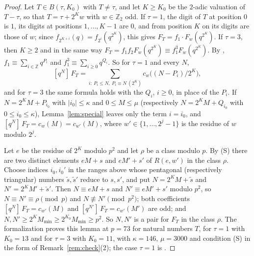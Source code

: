 \documentclass[12pt]{amsart}
\theoremstyle{definition}
\newcommand{\Z}{\mathbb{Z}}
\newcommand{\Zt}{\mathbb{Z}_2}
\newcommand{\B}{B}
\newcommand{\coef}[2]{[q^{#1}]\,#2}
\begin{document}
\begin{proof}
Let $T\in\B(\tau,K_0)$ with $T\ne\tau$, and let $K\ge K_0$ be the $2$-adic valuation of $T-\tau$, so that $T=\tau+2^Kw$ with $w\in\Zt$ odd. If $\tau=1$, the digit of $T$ at position $0$ is $1$, its digits at positions $1,\dots,K-1$ are $0$, and from position $K$ on its digits are those of $w$; since $f_{2^{K+i}}(q)=f_{2^i}(q^{2^K})$, this gives $F_T=f_1\cdot F_w(q^{2^K})$. If $\tau=3$, then $K\ge2$ and in the same way $F_T=f_1f_2F_w(q^{2^K})\equiv f_1^3F_w(q^{2^K})$. By \cite[Theorem~27]{KZ3}, $f_1\equiv\sum_{i\in\Z}q^{P_i}$ and $f_1^3\equiv\sum_{i\ge0}q^{Q_i}$. So for $\tau=1$ and every $N$,
\[
\coef{N}{F_T}=\sum_{i:\ P_i\le N,\ P_i\equiv N\ (2^K)}c_w\bigl((N-P_i)/2^K\bigr),
\]
and for $\tau=3$ the same formula holds with the $Q_i$, $i\ge0$, in place of the $P_i$. If $N=2^KM+P_{i_0}$ with $|i_0|\le\kappa$ and $0\le M\le\mu$ (respectively $N=2^KM+Q_{i_0}$ with $0\le i_0\le\kappa$), Lemma~\ref{lem:special} leaves only the term $i=i_0$, and $\coef{N}{F_T}=c_w(M)=c_{w'}(M)$, where $w'\in\{1,\dots,2^j-1\}$ is the residue of $w$ modulo $2^j$.

Let $e$ be the residue of $2^K$ modulo $p^2$ and let $\rho$ be a class modulo $p$. By (S) there are two distinct elements $eM+s$ and $eM'+s'$ of $R(e,w')$ in the class $\rho$. Choose indices $i_0,i_0'$ in the ranges above whose pentagonal (respectively triangular) numbers $\tilde s,\tilde s'$ reduce to $s,s'$, and put $N=2^KM+\tilde s$ and $N'=2^KM'+\tilde s'$. Then $N\equiv eM+s$ and $N'\equiv eM'+s'$ modulo $p^2$, so $N\equiv N'\equiv\rho\pmod p$ and $N\not\equiv N'\pmod{p^2}$; both coefficients $\coef{N}{F_T}=c_{w'}(M)$ and $\coef{N'}{F_T}=c_{w'}(M')$ are odd; and $N,N'\ge2^KM_{\min}\ge2^{K_0}M_{\min}\ge p^2$. So $N,N'$ is a pair for $F_T$ in the class $\rho$. The formalization proves this lemma at $p=73$ for natural numbers $T$, for $\tau=1$ with $K_0=13$ and for $\tau=3$ with $K_0=11$, with $\kappa=146$, $\mu=3000$ and condition (S) in the form of Remark~\ref{rem:check}(2); the case $\tau=1$ is .
\end{proof}
\end{document}
